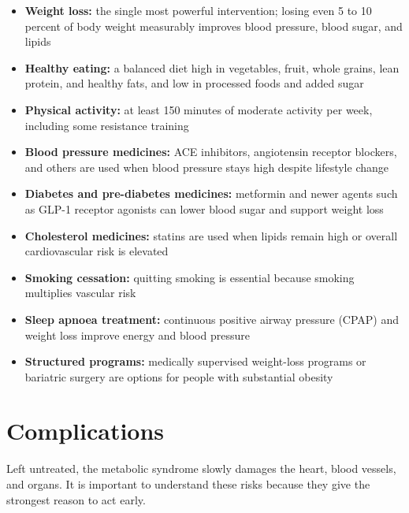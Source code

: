 \begin{itemize}
    \item \textbf{Weight loss:} the single most powerful intervention; losing even 5 to 10 percent of body weight measurably improves blood pressure, blood sugar, and lipids
    \item \textbf{Healthy eating:} a balanced diet high in vegetables, fruit, whole grains, lean protein, and healthy fats, and low in processed foods and added sugar
    \item \textbf{Physical activity:} at least 150 minutes of moderate activity per week, including some resistance training
    \item \textbf{Blood pressure medicines:} ACE inhibitors, angiotensin receptor blockers, and others are used when blood pressure stays high despite lifestyle change
    \item \textbf{Diabetes and pre-diabetes medicines:} metformin and newer agents such as GLP-1 receptor agonists can lower blood sugar and support weight loss
    \item \textbf{Cholesterol medicines:} statins are used when lipids remain high or overall cardiovascular risk is elevated
    \item \textbf{Smoking cessation:} quitting smoking is essential because smoking multiplies vascular risk
    \item \textbf{Sleep apnoea treatment:} continuous positive airway pressure (CPAP) and weight loss improve energy and blood pressure
    \item \textbf{Structured programs:} medically supervised weight-loss programs or bariatric surgery are options for people with substantial obesity
\end{itemize}

\section*{Complications}
Left untreated, the metabolic syndrome slowly damages the heart, blood vessels, and organs. It is important to understand these risks because they give the strongest reason to act early.

